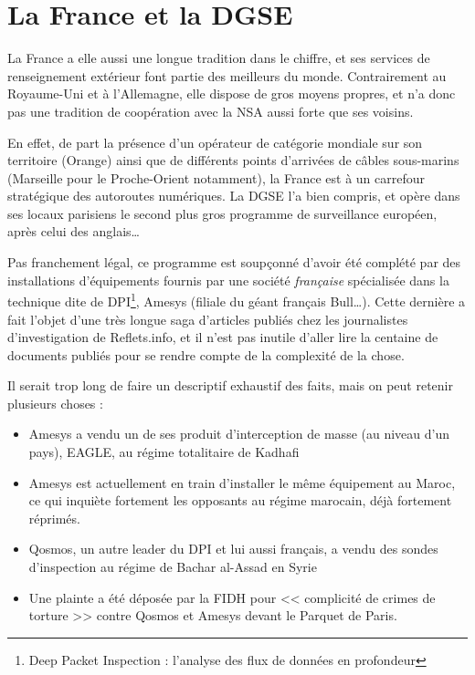\section{La France et la DGSE}

La France a elle aussi une longue tradition dans le chiffre, et ses
services de renseignement extérieur font partie des meilleurs du monde.
Contrairement au Royaume-Uni et à l'Allemagne, elle dispose de gros moyens
propres, et n'a donc pas une tradition de coopération avec la NSA aussi forte
que ses voisins. 

En effet, de part la présence d'un opérateur de catégorie mondiale
sur son territoire (Orange) ainsi que de différents points d'arrivées de câbles
sous-marins (Marseille pour le Proche-Orient notamment), la France est à un
carrefour stratégique des autoroutes numériques. La DGSE l'a bien compris, et
opère dans ses locaux parisiens le second plus gros programme de surveillance
européen, après celui des anglais\ldots\citep{DGSE}

Pas franchement légal, ce programme est soupçonné d'avoir été
complété par des installations\citep{reflets} d'équipements fournis par une
société \emph{française} spécialisée dans la technique dite de DPI\footnote{Deep
Packet Inspection :
l'analyse des flux de données en profondeur}, Amesys (filiale du géant français
Bull\ldots).
Cette dernière a fait l'objet d'une très longue saga d'articles publiés chez les journalistes d'investigation de
Reflets.info, et il n'est pas inutile d'aller lire la centaine de documents
publiés pour se rendre compte de la complexité de la chose.

Il serait trop long de faire un descriptif exhaustif des faits,
mais on peut retenir plusieurs choses :

\begin{itemize}
  \item Amesys a vendu un de ses produit d'interception de masse (au niveau
  d'un pays), EAGLE, au régime totalitaire de Kadhafi\citep{libye}
  \item Amesys est actuellement en train d'installer le même équipement au
  Maroc\citep{maroc}, ce qui inquiète fortement les opposants au régime
  marocain, déjà fortement réprimés.
  \item Qosmos, un autre leader du DPI et lui aussi français, a vendu des
  sondes d'inspection au régime de Bachar al-Assad en Syrie\citep{qosmos}
  \item Une plainte a été déposée par la FIDH pour << complicité de crimes de
  torture >> contre Qosmos et Amesys devant le Parquet de Paris.\citep{fidh}
\end{itemize}

